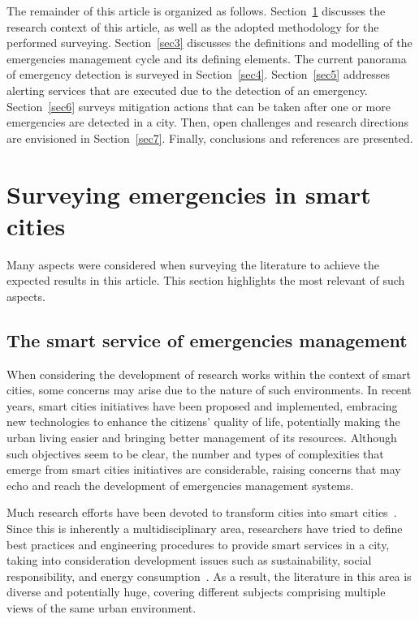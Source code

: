 \begin{refsection}
The remainder of this article is organized as follows. Section~\ref{sec2} discusses the research context of this article, as well as the adopted methodology for the performed surveying. Section~\ref{sec3} discusses the definitions and modelling of the emergencies management cycle and its defining elements. The current panorama of emergency detection is surveyed in Section~\ref{sec4}. Section~\ref{sec5} addresses alerting services that are executed due to the detection of an emergency. Section~\ref{sec6} surveys mitigation actions that can be taken after one or more emergencies are detected in a city. Then, open challenges and research directions are envisioned in Section~\ref{sec7}. Finally, conclusions and references are presented.

\section{Surveying emergencies in smart cities}\label{sec2}

Many aspects were considered when surveying the literature to achieve the expected results in this article. This section highlights the most relevant of such aspects.

\subsection{The smart service of emergencies management}

When considering the development of research works within the context of smart cities, some concerns may arise due to the nature of such environments. In recent years, smart cities initiatives have been proposed and implemented, embracing new technologies to enhance the citizens' quality of life, potentially making the urban living easier and bringing better management of its resources. Although such objectives seem to be clear, the number and types of complexities that emerge from smart cities initiatives are considerable, raising concerns that may echo and reach the development of emergencies management systems.

Much research efforts have been devoted to transform cities into smart cities~\cite{citiestransforming,smartstrategy}. Since this is inherently a multidisciplinary area, researchers have tried to define best practices and engineering procedures to provide smart services in a city, taking into consideration development issues such as sustainability, social responsibility, and energy consumption~\cite{citiestransforming2}. As a result, the literature in this area is diverse and potentially huge, covering different subjects comprising multiple views of the same urban environment.


\end{refsection}
